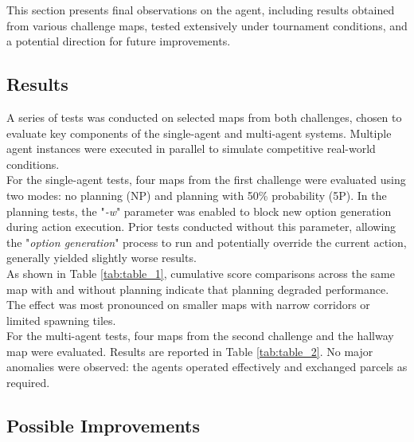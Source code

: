 
    This section presents final observations on the agent, including results obtained from various challenge maps, tested extensively under tournament conditions, and a potential direction for future improvements.

    \subsection{Results}
        A series of tests was conducted on selected maps from both challenges, chosen to evaluate key components of the single-agent and multi-agent systems. Multiple agent instances were executed in parallel to simulate competitive real-world conditions.
        \medskip\\
        For the single-agent tests, four maps from the first challenge were evaluated using two modes: no planning (NP) and planning with 50\% probability (5P). In the planning tests, the "\textit{-w}" parameter was enabled to block new option generation during action execution. Prior tests conducted without this parameter, allowing the "\textit{option generation}" process to run and potentially override the current action, generally yielded slightly worse results.
        \medskip\\
        As shown in Table \ref{tab:table_1}, cumulative score comparisons across the same map with and without planning indicate that planning degraded performance. The effect was most pronounced on smaller maps with narrow corridors or limited spawning tiles.
        \medskip\\
        For the multi-agent tests, four maps from the second challenge and the hallway map were evaluated. Results are reported in Table \ref{tab:table_2}. No major anomalies were observed: the agents operated effectively and exchanged parcels as required.
    
    \subsection{Possible Improvements}

